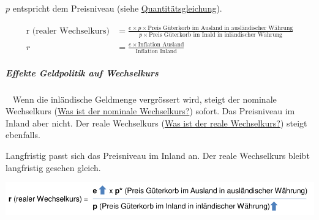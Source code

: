 \documentclass[11pt,twoside,landscape]{article}
\begin{document}
\begin{multicols}{3}
\(p\) entspricht dem Preisniveau (siehe \href{../../../roam/20220614170056-wie_sieht_der_theoretische_zusammenhang_zwischen_der_geldpolitik_der_zentralbank_und_der_inflation_aus.org}{Quantitätsgleichung}).

\begin{equation}
  \label{eqn:realer-wechselkurs}
  \begin{align}
  \text{r (realer Wechselkurs)} &= \frac{e \times p \times \text{Preis Güterkorb im Ausland in ausländischer Währung}}{p \times \text{Preis Güterkorb im Inald in inländischer Währung}} \\
    r &= \frac{e \times \text{Inflation Ausland}}{\text{Inflation Inland}}
  \end{align}

\end{equation}

\subparagraph{Effekte Geldpolitik auf Wechselkurs} \
\label{sec:org1119dd8}
Wenn die inländische Geldmenge vergrössert wird, steigt der nominale Wechselkurs (\href{../../../roam/20220615143018-was_ist_der_nominale_wechselkurs.org}{Was ist der nominale Wechselkurs?}) sofort.
Das Preisniveau im Inland aber nicht.
Der reale Wechselkurs (\href{../../../roam/20220615150048-was_ist_der_reale_wechselkurs.org}{Was ist der reale Wechselkurs?}) steigt ebenfalls.

Langfristig passt sich das Preisniveau im Inland an.
Der reale Wechselkurs bleibt langfristig gesehen gleich.


{
\begin{center}
\includegraphics[width=.9\linewidth]{img/langfritiger_effekt_realer_wechselkurs.png}
\end{center}
\label{fig:langfristige-effekte}
}


\end{multicols}
\end{document}
